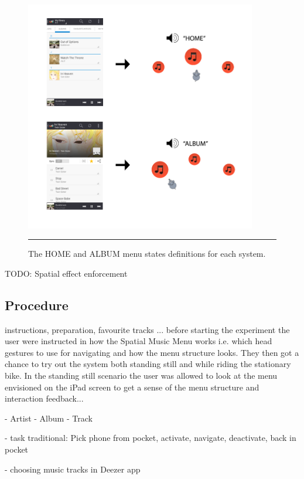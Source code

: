 \begin{figure}[t]
	\centering
		\includegraphics[width=0.9\textwidth,height=\textheight,keepaspectratio]{./Figures/menustates.png}
		\rule{35em}{1pt}
	\caption[Menu states comparison]{The HOME and ALBUM menu states definitions for each system.}
	\label{fig:menustates}
\end{figure}

TODO: Spatial effect enforcement

\subsection{Procedure}
instructions, preparation, favourite tracks
... before starting the experiment the user were instructed in how the Spatial Music Menu works i.e. which head gestures to use for navigating and how the menu structure looks. They then got a chance to try out the system both standing still and while riding the stationary bike. In the standing still scenario the user was allowed to look at the menu envisioned on the iPad screen to get a sense of the menu structure and interaction feedback...


- Artist - Album - Track

- task traditional: Pick phone from pocket, activate, navigate, deactivate, back in pocket

- choosing music tracks in Deezer app

